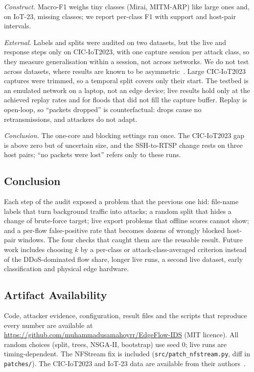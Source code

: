 \emph{Construct.} Macro-F1 weighs tiny classes (Mirai, MITM-ARP) like large ones and, on IoT-23, missing classes; we report per-class F1 with support and host-pair intervals.

\emph{External.} Labels and splits were audited on two datasets, but the live and response steps only on CIC-IoT2023, with one capture session per attack class, so they measure generalisation within a session, not across networks. We do not test across datasets, where results are known to be asymmetric~\cite{ali2026siamxbert}. Large CIC-IoT2023 captures were trimmed, so a temporal split covers only their start. The testbed is an emulated network on a laptop, not an edge device; live results hold only at the achieved replay rates and for floods that did not fill the capture buffer. Replay is open-loop, so ``packets dropped'' is counterfactual: drops cause no retransmissions, and attackers do not adapt.

\emph{Conclusion.} The one-core and blocking settings ran once. The CIC-IoT2023 gap is above zero but of uncertain size, and the SSH-to-RTSP change rests on three host pairs; ``no packets were lost'' refers only to these runs.

\subsection{Conclusion}

Each step of the audit exposed a problem that the previous one hid: file-name labels that turn background traffic into attacks; a random split that hides a change of brute-force target; live export problems that offline scores cannot show; and a per-flow false-positive rate that becomes dozens of wrongly blocked host-pair windows. The four checks that caught them are the reusable result. Future work includes choosing $k$ by a per-class or attack-class-averaged criterion instead of the DDoS-dominated flow share, longer live runs, a second live dataset, early classification and physical edge hardware.

\subsection{Artifact Availability}

Code, attacker evidence, configuration, result files and the scripts that reproduce every number are available at \url{https://github.com/muhammadusamahoyrr/EdgeFlow-IDS} (MIT licence). All random choices (split, trees, NSGA-II, bootstrap) use seed 0; live runs are timing-dependent. The NFStream fix is included (\nolinkurl{src/patch_nfstream.py}, diff in \nolinkurl{patches/}).
The CIC-IoT2023 and IoT-23 data are available from their authors~\cite{neto2023ciciot2023,garcia2020iot23}.
